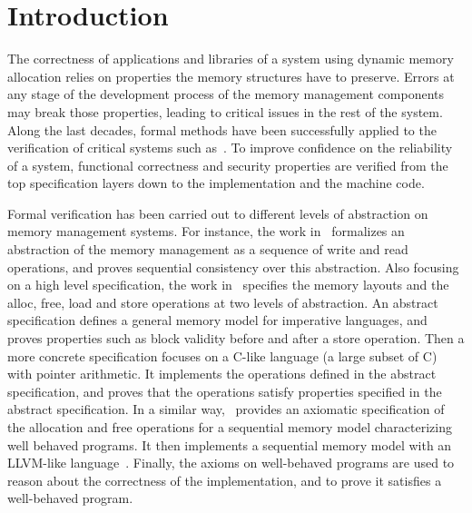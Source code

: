 \section{Introduction}
The correctness of applications and libraries of a system using dynamic memory allocation relies on properties the memory structures have to preserve. Errors at any stage of the development process of the memory management components may break those properties, leading to critical issues in the rest of the system. Along the last decades, formal methods have been successfully applied to the verification of critical systems such as~\cite{reg_rushby, reg_luu}. To improve confidence on the reliability of a system, functional correctness and security properties are verified from the top specification layers down to the implementation and the machine code.

Formal verification has been carried out to different levels of abstraction on memory management systems. For instance, the work in~\cite{reg_higham} formalizes an abstraction of the memory management as a sequence of write and read operations, and proves sequential consistency over this abstraction. Also focusing on a high level specification, the work in~\cite{reg_blazy} specifies the memory layouts and the alloc, free, load and store operations at two levels of abstraction. An abstract specification defines a general memory model for imperative languages, and proves properties such as block validity before and after a store operation. Then a more concrete specification focuses on a C-like language (a large subset of C) with pointer arithmetic. It implements the operations defined in the abstract specification, and proves that the operations satisfy properties specified in the abstract specification. In a similar way,~\cite{reg_mansky} provides an axiomatic specification of the allocation and free operations for a sequential memory model characterizing well behaved programs. It then implements a sequential memory model with an LLVM-like language~\cite{reg_chris}. Finally, the axioms on well-behaved programs are used to reason about the correctness of the implementation, and to prove it satisfies a well-behaved program.

